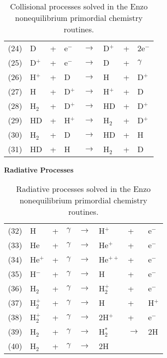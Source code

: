 \begin{table}
\begin{center}
\begin{tabular}{llllllll}
\hline
(24) & D & + & e$^-$ & $\rightarrow$ & D$^+$ &+& 2e$^-$ \\
(25) & D$^+$ &+ &e$^-$ & $\rightarrow$ & D &+ &$\gamma$ \\
(26) & H$^+$ &+ &D & $\rightarrow$ & H &+ &D$^+$ \\
(27) & H &+ &D$^+$ & $\rightarrow$ & H$^+$ &+ &D \\
(28) & H$_2$ &+ &D$^+$ & $\rightarrow$ & HD &+ &D$^+$ \\
(29) & HD &+ &H$^+$ & $\rightarrow$ & H$_2$ &+ &D$^+$ \\
(30) & H$_2$ &+ &D & $\rightarrow$ & HD &+ &H \\
(31) & HD &+ &H & $\rightarrow$ & H$_2$ &+ &D \\


\end{tabular}
\caption[]{Collisional processes solved in the Enzo nonequilibrium
primordial chemistry routines.}
\label{table.collisional}
\end{center}
\end{table}



\begin{table}
\begin{center}
{\bfseries Radiative Processes}\\[1ex]
\begin{tabular}{llllllll}
(32) & H & + & $\gamma$ & $\rightarrow$ & H$^+$ & + & e$^-$ \\
(33) & He & + & $\gamma$ & $\rightarrow$ & He$^+$ & + & e$^-$ \\
(34) & He$^+$ & + & $\gamma$ & $\rightarrow$ & He$^{++}$ & + & e$^-$ \\
(35) & H$^-$ & + & $\gamma$ & $\rightarrow$ & H & + & e$^-$ \\
(36) & H$_2$ & + & $\gamma$ & $\rightarrow$ & H$_2^+$ & + & e$^-$ \\
(37) & H$_2^+$ & + & $\gamma$ & $\rightarrow$ & H & + & H$^+$ \\
(38) & H$_2^+$ & + & $\gamma$ & $\rightarrow$ & 2H$^+$ & + & e$^-$ \\
(39) & H$_2$ & + & $\gamma$ & $\rightarrow$ & H$_2^*$ & $\rightarrow$ & 2H \\
(40) & H$_2$ & + & $\gamma$ & $\rightarrow$ & 2H &  & 
\end{tabular}
\caption[]{Radiative processes solved in the Enzo nonequilibrium
primordial chemistry routines. }
\label{table.radiative}
\end{center}
\end{table}
